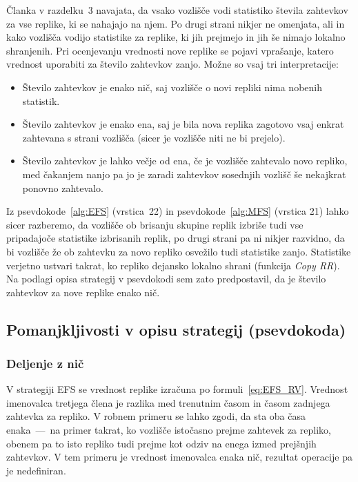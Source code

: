 \documentclass[a4paper, 12pt]{book}
\begin{document}
Članka v razdelku~3 navajata, da vsako vozlišče vodi statistiko
števila zahtevkov za vse replike, ki se nahajajo na njem. Po drugi strani
nikjer ne omenjata, ali in kako vozlišča vodijo statistike za replike, ki jih
prejmejo in jih še nimajo lokalno shranjenih.
Pri ocenjevanju vrednosti nove replike se pojavi vprašanje, katero vrednost
uporabiti za število zahtevkov zanjo. Možne so vsaj tri interpretacije:

\begin{itemize}
\item Število zahtevkov je enako nič, saj vozlišče o novi repliki nima nobenih
statistik.
\item Število zahtevkov je enako ena, saj je bila nova replika zagotovo vsaj
enkrat zahtevana s strani vozlišča (sicer je vozlišče niti ne bi prejelo).
\item Število zahtevkov je lahko večje od ena, če je vozlišče zahtevalo novo
repliko, med čakanjem nanjo pa jo je zaradi zahtevkov sosednjih vozlišč
še nekajkrat ponovno zahtevalo.
\end{itemize}

Iz psevdokode~\ref{alg:EFS} (vrstica~22) in psevdokode~\ref{alg:MFS} (vrstica 21)
lahko sicer razberemo, da vozlišče ob brisanju skupine replik izbriše tudi vse
pripadajoče statistike izbrisanih replik, po drugi strani pa ni nikjer razvidno,
da bi vozlišče že ob zahtevku za novo repliko osvežilo tudi statistike zanjo.
Statistike verjetno ustvari takrat, ko repliko dejansko lokalno shrani
(funkcija \textit{Copy RR}). Na podlagi opisa strategij v psevdokodi sem zato
predpostavil, da je število zahtevkov za nove replike enako nič.


\subsection{Pomanjkljivosti v opisu strategij (psevdokoda)}

\subsubsection{Deljenje z nič}

V strategiji EFS se vrednost replike izračuna po formuli~\eqref{eq:EFS_RV}.
Vrednost imenovalca tretjega člena je razlika med trenutnim časom in časom
zadnjega zahtevka za repliko. V robnem primeru se lahko zgodi, da sta oba časa
enaka~---~na primer takrat, ko vozlišče istočasno prejme zahtevek za repliko,
obenem pa to isto repliko tudi prejme kot odziv na enega izmed prejšnjih
zahtevkov. V tem primeru je vrednost imenovalca enaka nič, rezultat operacije
pa je nedefiniran.
\end{document}
